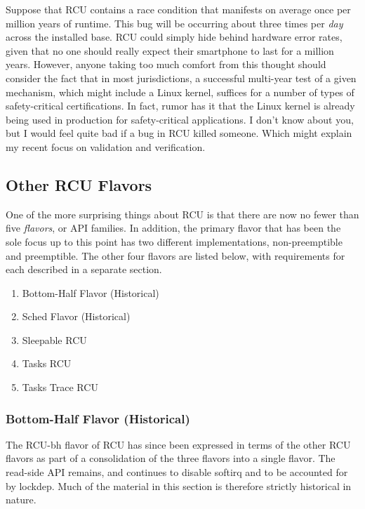 Suppose that RCU contains a race condition that manifests on average
once per million years of runtime.
This bug will be occurring about
three times per \emph{day} across the installed base. RCU could simply hide
behind hardware error rates, given that no one should really expect
their smartphone to last for a million years.
However, anyone taking too
much comfort from this thought should consider the fact that in most
jurisdictions, a successful multi-year test of a given mechanism, which
might include a Linux kernel, suffices for a number of types of
safety-critical certifications.
In fact, rumor has it that the Linux
kernel is already being used in production for safety-critical
applications.
I don't know about you, but I would feel quite bad if a
bug in RCU killed someone.
Which might explain my recent focus on
validation and verification.


\subsection{Other RCU Flavors}

One of the more surprising things about RCU is that there are now no
fewer than five \emph{flavors}, or API families.
In addition, the primary
flavor that has been the sole focus up to this point has two different
implementations, non-preemptible and preemptible.
The other four flavors
are listed below, with requirements for each described in a separate
section.

\begin{enumerate}
\item Bottom-Half Flavor (Historical)
\item Sched Flavor (Historical)
\item Sleepable RCU
\item Tasks RCU
\item Tasks Trace RCU
\end{enumerate}


\subsubsection{Bottom-Half Flavor (Historical)}

The RCU-bh flavor of RCU has since been expressed in terms of the other
RCU flavors as part of a consolidation of the three flavors into a
single flavor.
The read-side API remains, and continues to disable
softirq and to be accounted for by lockdep.
Much of the material in this
section is therefore strictly historical in nature.

